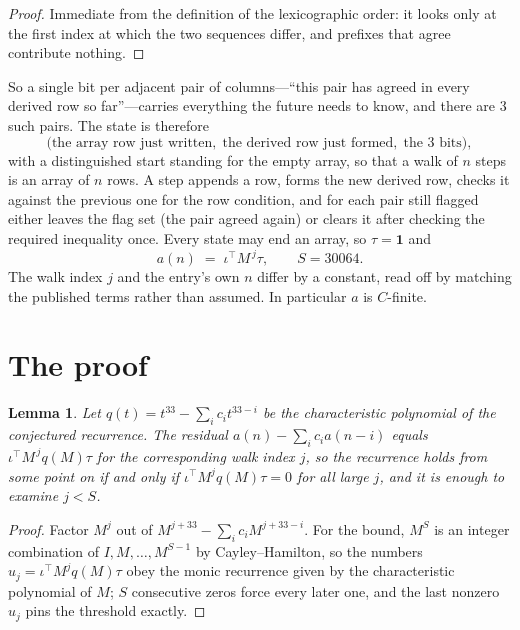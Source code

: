 \documentclass[11pt,a4paper]{article}
\theoremstyle{plain}
\newtheorem{lemma}[theorem]{Lemma}
\theoremstyle{definition}
\begin{document}
\begin{proof}
Immediate from the definition of the lexicographic order: it looks only at the first index at
which the two sequences differ, and prefixes that agree contribute nothing.
\end{proof}

So a single bit per adjacent pair of columns---``this pair has agreed in every derived row so
far''---carries everything the future needs to know, and there are $3$ such pairs. The state
is therefore
\[
\bigl(\text{the array row just written},\; \text{the derived row just formed},\;
\text{the 3 bits}\bigr),
\]
with a distinguished start standing for the empty array, so that a walk of $n$ steps is an array
of $n$ rows. A step appends a row, forms the new derived row, checks it against the previous one
for the row condition, and for each pair still flagged either leaves the flag set (the pair
agreed again) or clears it after checking the required inequality once. Every state may end an
array, so $\tau=\mathbf{1}$ and
\[
a(n)\;=\;\iota^{\!\top}M^{\,j}\tau ,\qquad S=30064.
\]
The walk index $j$ and the entry's own $n$ differ by a constant, read off by matching the
published terms rather than assumed. In particular $a$ is $C$-finite.

\section{The proof}

\begin{lemma}\label{lem:crit}
Let $q(t)=t^{33}-\sum_i c_it^{33-i}$ be the characteristic polynomial of the
conjectured recurrence. The residual $a(n)-\sum_ic_ia(n-i)$ equals
$\iota^{\!\top}M^{\,j}q(M)\tau$ for the corresponding walk index $j$, so the recurrence
holds from some point on if and only if $\iota^{\!\top}M^{j}q(M)\tau=0$ for all large $j$,
and it is enough to examine $j<S$.
\end{lemma}

\begin{proof}
Factor $M^{j}$ out of $M^{j+33}-\sum_ic_iM^{j+33-i}$. For the bound, $M^{S}$
is an integer combination of $I,M,\dots,M^{S-1}$ by Cayley--Hamilton, so the numbers
$u_j=\iota^{\!\top}M^{j}q(M)\tau$ obey the monic recurrence given by the characteristic
polynomial of $M$; $S$ consecutive zeros force every later one, and the last nonzero $u_j$
pins the threshold exactly.
\end{proof}
\end{document}
